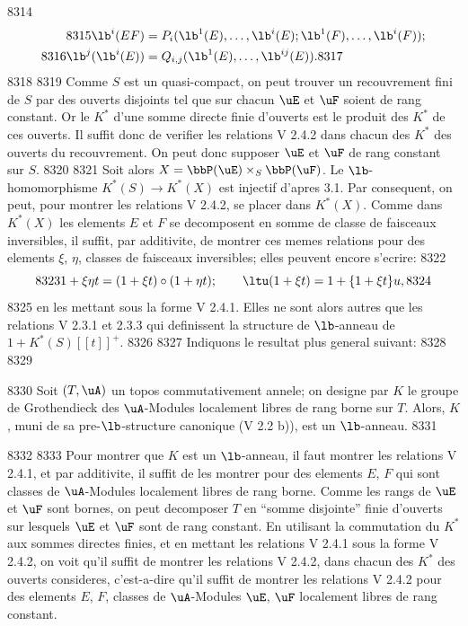   8314	\begin{align*}
  8315	\lb^i(EF) &= P_i(\lb^1(E), \ldots, \lb^i(E); \lb^1(F), \ldots, \lb^i(F));\\
  8316	\lb^j(\lb^i(E)) &= Q_{i,j}(\lb^1(E), \ldots, \lb^{ij}(E)).
  8317	\end{align*}
  8318	
  8319	Comme $S$ est un quasi-compact, on peut trouver un recouvrement fini de $S$ par des ouverts disjoints tel que sur chacun $\uE$ et $\uF$ soient de rang constant. Or le $K^*$ d'une somme directe finie d'ouverts est le produit des $K^*$ de ces ouverts. Il suffit donc de verifier les relations V 2.4.2 dans chacun des $K^*$ des ouverts du recouvrement. On peut donc supposer $\uE$ et $\uF$ de rang constant sur $S$.
  8320	
  8321	Soit alors $X = \bbP(\uE) \times_S \bbP(\uF)$. Le $\lb$-homomorphisme $K^*(S) \longrightarrow K^*(X)$ est injectif d'apres 3.1. Par consequent, on peut, pour montrer les relations V 2.4.2, se placer dans $K^*(X)$. Comme dans $K^*(X)$ les elements $E$ et $F$ se decomposent en somme de classe de faisceaux inversibles, il suffit, par additivite, de montrer ces memes relations pour des elements $\xi$, $\eta$, classes de faisceaux inversibles; elles peuvent encore s'ecrire:
  8322	\[
  8323	1 + \xi\eta t = (1 + \xi t) \circ (1 + \eta t); \qquad \ltu(1+\xi t) = 1 + \{1+\xi t\}u,
  8324	\]
  8325	en les mettant sous la forme V 2.4.1. Elles ne sont alors autres que les relations V 2.3.1 et 2.3.3 qui definissent la structure de $\lb$-anneau de $1 + K^*(S)[[t]]^+$.
  8326	
  8327	Indiquons le resultat plus general suivant:
  8328	
  8329	\begin{thm}
  8330	Soit $(T, \uA)$ un topos commutativement annele; on designe par $K$ le groupe de Grothendieck des $\uA$-Modules localement libres de rang borne sur $T$. Alors, $K$, muni de sa pre-$\lb$-structure canonique (V 2.2 b)), est un $\lb$-anneau.
  8331	\end{thm}
  8332	
  8333	Pour montrer que $K$ est un $\lb$-anneau, il faut montrer les relations V 2.4.1, et par additivite, il suffit de les montrer pour des elements $E$, $F$ qui sont classes de $\uA$-Modules localement libres de rang borne. Comme les rangs de $\uE$ et $\uF$ sont bornes, on peut decomposer $T$ en ``somme disjointe'' finie d'ouverts sur lesquels $\uE$ et $\uF$ sont de rang constant. En utilisant la commutation du $K^*$ aux sommes directes finies, et en mettant les relations V 2.4.1 sous la forme V 2.4.2, on voit qu'il suffit de montrer les relations V 2.4.2, dans chacun des $K^*$ des ouverts consideres, c'est-a-dire qu'il suffit de montrer les relations V 2.4.2 pour des elements $E$, $F$, classes de $\uA$-Modules $\uE$, $\uF$ localement libres de rang constant.
